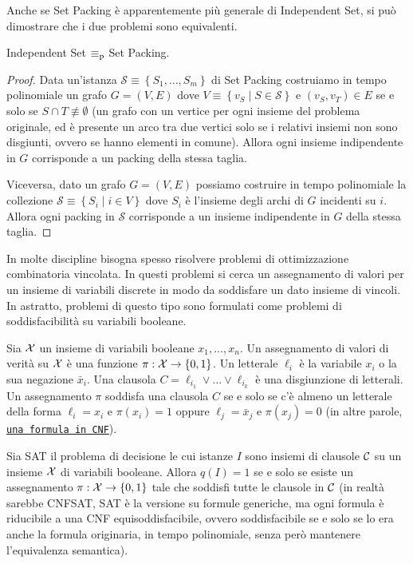 Anche se Set Packing è apparentemente più generale di Independent Set, si può dimostrare che i due problemi sono equivalenti. \\

\begin{fact}
    Independent Set $\equiv_\text{p}$ Set Packing.
\end{fact}
\begin{proof}
    Data un'istanza $\mathcal{S} \equiv \left\{S_1, \dots, S_m\right\}$ di Set Packing costruiamo in tempo polinomiale un grafo $G = (V,E)$ dove $V \equiv \left\{v_S \mid S \in \mathcal{S} \right\}$ e $\left(v_S, v_T\right) \in E$ se e solo se $S \cap T \not \equiv \emptyset$ (un grafo con un vertice per ogni insieme del problema originale, ed è presente un arco tra due vertici solo se i relativi insiemi non sono disgiunti, ovvero se hanno elementi in comune). Allora ogni insieme indipendente in $G$ corrisponde a un packing della stessa taglia.

    Viceversa, dato un grafo $G = (V,E)$ possiamo costruire in tempo polinomiale la collezione $\mathcal{S} \equiv \left\{S_i \mid i \in V \right\}$ dove $S_i$ è l'insieme degli archi di $G$ incidenti su $i$. Allora ogni packing in $\mathcal{S}$ corrisponde a un insieme indipendente in $G$ della stessa taglia.
\end{proof}

In molte discipline bisogna spesso risolvere problemi di ottimizzazione combinatoria vincolata. In questi problemi si cerca un assegnamento di valori per un insieme di variabili discrete in modo da soddisfare un dato insieme di vincoli. In astratto, problemi di questo tipo sono formulati come problemi di soddisfacibilità su variabili booleane.

Sia $\mathcal{X}$ un insieme di variabili booleane $x_1, \dots, x_n$. Un assegnamento di valori di verità su $\mathcal{X}$ è una funzione $\pi: \mathcal{X} \rightarrow \{0,1\}$. Un letterale $\ell_i$ è la variabile $x_i$ o la sua negazione $\bar x_i$. Una clausola $C = \ell_{i_1} \vee \dots \vee \ell_{i_k}$ è una disgiunzione di letterali. Un assegnamento $\pi$ soddisfa una clausola $C$ se e solo se c'è almeno un letterale della forma $\ell_i = x_i$ e $\pi(x_i) = 1$ oppure $\ell_j = \bar x_j$ e $\pi(x_j) = 0$ (in altre parole, \href{https://it.wikipedia.org/wiki/Forma_normale_congiuntiva}{\texttt{una formula in CNF}}).

Sia \textsc{SAT} il problema di decisione le cui istanze $I$ sono insiemi di clausole $\mathcal{C}$ su un insieme $\mathcal{X}$ di variabili booleane. Allora $q(I) = 1$ se e solo se esiste un assegnamento $\pi: \mathcal{X} \rightarrow \left\{0,1\right\}$ tale che soddisfi tutte le clausole in $\mathcal{C}$ (in realtà sarebbe \textsc{CNFSAT}, SAT è la versione su formule generiche, ma ogni formula è riducibile a una CNF equisoddisfacibile, ovvero soddisfacibile se e solo se lo era anche la formula originaria, in tempo polinomiale, senza però mantenere l'equivalenza semantica).

